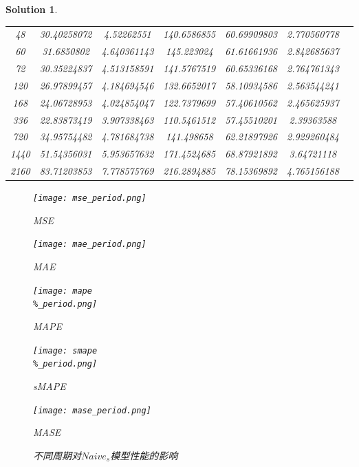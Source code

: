 \documentclass[a4paper,UTF8]{article}
\numberwithin{equation}{section}
\newtheorem*{mySol}{Solution}
\begin{document}
\begin{mySol}
\begin{table}[]
\begin{tabular}{ccccccc}
				48	& 30.40258072	& 4.52262551	& 140.6586855	& 60.69909803	& 2.770560778 \\
				60	& 31.6850802	& 4.640361143	& 145.223024	& 61.61661936	& 2.842685637 \\
				72	& 30.35224837	& 4.513158591	& 141.5767519	& 60.65336168	& 2.764761343 \\
				120	& 26.97899457	& 4.184694546	& 132.6652017	& 58.10934586	& 2.563544241 \\
				168	& 24.06728953	& 4.024854047	& 122.7379699	& 57.40610562	& 2.465625937 \\
				336	& 22.83873419	& 3.907338463	& 110.5461512	& 57.45510201	& 2.39363588 \\
				720	& 34.95754482	& 4.781684738	& 141.498658	& 62.21897926	& 2.929260484 \\
				1440	& 51.54356031	& 5.953657632	& 171.4524685	& 68.87921892	& 3.64721118 \\
				2160	& 83.71203853	& 7.778575769	& 216.2894885	& 78.15369892	& 4.765156188 \\
				
				\bottomrule
			\end{tabular}
			\label{tb:res2}
		\end{table}
	
		\begin{figure}
			\caption{不同周期对$Naive_s$模型性能的影响}
			\begin{minipage}{0.5\linewidth}
				\centerline{\texttt{[image: mse\_period.png]}}
				\centerline{MSE}
			\end{minipage}
			\hfill 
			\begin{minipage}{0.5\linewidth}
				\centerline{\texttt{[image: mae\_period.png]}}
				\centerline{MAE}
			\end{minipage}
			\vfill
			\begin{minipage}{0.5\linewidth}
				\centerline{\texttt{[image: mape\\\%\_period.png]}}
				\centerline{MAPE}
			\end{minipage}
			\hfill 
			\begin{minipage}{0.5\linewidth}
				\centerline{\texttt{[image: smape\\\%\_period.png]}}
				\centerline{sMAPE}
			\end{minipage}
			\vfill
			\begin{minipage}{1.0\linewidth}
				\centerline{\texttt{[image: mase\_period.png]}}
				\centerline{MASE}
			\end{minipage}
			\label{fig:2}
		\end{figure}
	\end{mySol}
\end{document}
